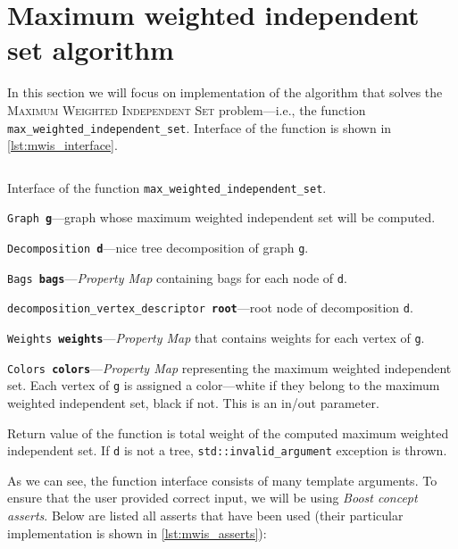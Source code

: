 \documentclass[thesis=B,english]{FITthesis}[2019/03/21]
\begin{document}
\section{Maximum weighted independent set algorithm}\label{sec:mwis}
In this section we will focus on implementation of the algorithm that solves the \textsc{Maximum Weighted Independent Set} problem---i.e., the function \texttt{max\_weighted\_independent\_set}. Interface of the function is shown in \autoref{lst:mwis_interface}.

\begin{listing}[H]
	\inputminted[tabsize=2,breaklines,bgcolor=codebg]{c++}{snippets/mwis_interface.m}
	\caption[Interface of the function \texttt{max\_weighted\_independent\_set}]{Interface of the function \texttt{max\_weighted\_independent\_set}.}
	\label{lst:mwis_interface}
\end{listing}
\newpage
\noindent\texttt{Graph \textbf{g}}---graph whose maximum weighted independent set will be computed.

\noindent\texttt{Decomposition \textbf{d}}---nice tree decomposition of graph \texttt{g}.

\noindent\texttt{Bags \textbf{bags}}---\emph{Property Map} containing bags for each node of \texttt{d}.

\noindent\texttt{decomposition\_vertex\_descriptor \textbf{root}}---root node of decomposition \texttt{d}.

\noindent\texttt{Weights \textbf{weights}}---\emph{Property Map} that contains weights for each vertex of \texttt{g}.

\noindent\texttt{Colors \textbf{colors}}---\emph{Property Map} representing the maximum weighted independent set. Each vertex of \texttt{g} is assigned a color---white if they belong to the maximum weighted independent set, black if not. This is an in/out parameter.

Return value of the function is total weight of the computed maximum weighted independent set. If \texttt{d} is not a tree, \texttt{std::invalid\_argument} exception is thrown.

As we can see, the function interface consists of many template arguments. To ensure that the user provided correct input, we will be using \emph{Boost concept asserts}. Below are listed all asserts that have been used (their particular implementation is shown in \autoref{lst:mwis_asserts}):
\end{document}
